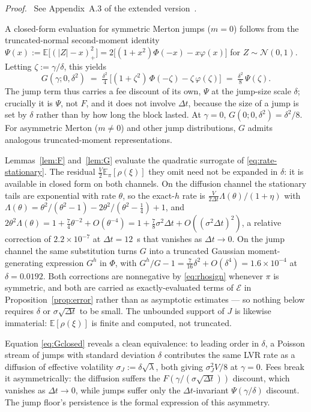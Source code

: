 \documentclass[runningheads]{llncs}
\newcommand{\E}{\mathbb{E}}
\newcommand{\dt}{\Delta t}
\newcommand{\1}{\mathbf{1}}
\newif\ifextended
\newcommand{\deferproof}[1]{%
  \par\smallskip\noindent\textit{Proof.}\ \ifextended
  See Appendix~#1.\else
  See Appendix~#1 of the extended version~\cite{bundi2026ext}.\fi\par\smallskip}
\begin{document}
\deferproof{A.3}

A closed-form evaluation for symmetric Merton jumps ($m=0$) follows from the truncated-normal second-moment identity
$\Psi(x) := \E\big[(|Z|-x)_+^2\big] = 2\big[(1+x^2)\Phi(-x) - x\varphi(x)\big]$ for $Z\sim\mathcal N(0,1)$.
Letting $\zeta := \gamma/\delta$, this yields
\begin{equation}\label{eq:Gclosed}
G(\gamma; 0, \delta^2) \;=\; \tfrac{\delta^2}{4}\,\big[(1+\zeta^2)\,\Phi(-\zeta) - \zeta\,\varphi(\zeta)\big] \;=\; \tfrac{\delta^2}{8}\,\Psi(\zeta).
\end{equation}
The jump term thus carries a fee discount of its own, $\Psi$ at the jump-size scale $\delta$; crucially it is $\Psi$, not $F$, and it does not involve $\dt$, because the size of a jump is set by $\delta$ rather than by how long the block lasted. At $\gamma=0$, $G(0;0,\delta^2) = \delta^2/8$. For asymmetric Merton ($m \neq 0$) and other jump distributions, $G$ admits analogous truncated-moment representations.

\begin{remark}\label{rem:curvature}
Lemmas~\ref{lem:F} and~\ref{lem:G} evaluate the quadratic surrogate of \eqref{eq:rate-stationary}. The residual $\tfrac{V}{2}\E_\pi[\rho(\xi)]$ they omit need not be expanded in $\delta$: it is available in closed form on both channels. On the diffusion channel the stationary tails are exponential with rate $\theta$, so the exact-$h$ rate is $\tfrac{V}{2\dt}\Lambda(\theta)/(1+\eta)$ with $\Lambda(\theta) = \theta^2/(\theta^2-1) - 2\theta^2/(\theta^2-\tfrac14) + 1$, and
$2\theta^2\Lambda(\theta) = 1 + \tfrac{7}{4}\theta^{-2} + O(\theta^{-4}) = 1 + \tfrac{7}{8}\sigma^2\dt + O((\sigma^2\dt)^2)$,
a relative correction of $2.2\times10^{-7}$ at $\dt=12$~s that vanishes as $\dt\to0$. On the jump channel the same substitution turns $G$ into a truncated Gaussian moment-generating expression $G^{h}$ in $\Phi$, with $G^{h}/G - 1 = \tfrac{7}{16}\delta^2 + O(\delta^4) = 1.6\times10^{-4}$ at $\delta=0.0192$. Both corrections are nonnegative by \eqref{eq:rhosign} whenever $\pi$ is symmetric, and both are carried as exactly-evaluated terms of $\mathcal{E}$ in Proposition~\ref{prop:error} rather than as asymptotic estimates --- so nothing below requires $\delta$ or $\sigma\sqrt{\dt}$ to be small. The unbounded support of $J$ is likewise immaterial: $\E[\rho(\xi)]$ is finite and computed, not truncated.
\end{remark}

\begin{remark}\label{rem:lvrequivalence}
Equation \eqref{eq:Gclosed} reveals a clean equivalence: to leading order in $\delta$, a Poisson stream of jumps with standard deviation $\delta$ contributes the same LVR rate as a diffusion of effective volatility $\sigma_J := \delta\sqrt{\lambda}$, both giving $\sigma_J^2 V/8$ at $\gamma=0$. Fees break it asymmetrically: the diffusion suffers the $F(\gamma/(\sigma\sqrt{\dt}))$ discount, which vanishes as $\dt \to 0$, while jumps suffer only the $\dt$-invariant $\Psi(\gamma/\delta)$ discount. The jump floor's persistence is the formal expression of this asymmetry.
\end{remark}
\end{document}
